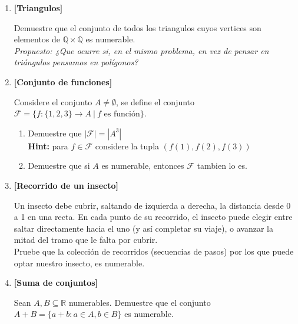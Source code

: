 \documentclass[letterpaper,11pt]{article}
\newcommand{\Q}{\mathbb Q}
\newcommand{\R}{\mathbb R}
\theoremstyle{plain}
\begin{document}
\begin{enumerate}[\bf P1.]
\begin{enumerate}
            
        \end{enumerate}
    
    \item \textbf{[Triangulos]}
    
    Demuestre que el conjunto de todos los triangulos cuyos vertices son elementos de $\Q\times \Q$ es numerable.\\
    \textit{Propuesto: ¿Que ocurre si, en el mismo problema, en vez de pensar en triángulos pensamos en polígonos?}
    
    \item \textbf{[Conjunto de funciones]}
    
    Considere el conjunto $A\neq \emptyset$, se define el conjunto $\mathcal{F}=\{f:\{1,2,3\} \to A ~|~ f \text{ es función} \}$.
        \begin{enumerate}
            \item Demuestre que $|\mathcal{F}|=|A^{3}|$\\
            \textbf{Hint:} para $f\in \mathcal{F}$ considere la tupla $(f(1),f(2),f(3))$
            \item Demuestre que si $A$ es numerable, entonces $\mathcal{F}$ tambien lo es.
        \end{enumerate}
        
    \item \textbf{[Recorrido de un insecto]}
    
    Un insecto debe cubrir, saltando de izquierda a derecha, la distancia desde 0 a 1 en una recta. En cada punto de su recorrido, el insecto puede elegir entre saltar directamente hacia el uno (y así completar su viaje), o avanzar la mitad del tramo que le falta por cubrir.\\
    Pruebe que la colección de recorridos (secuencias de pasos) por los que puede optar nuestro insecto, es numerable.
    
    \item \textbf{[Suma de conjuntos]}
    
    Sean $A,B \subseteq \R$ numerables. Demuestre que el conjunto $A+B=\{a+b : a \in A, b \in B \}$ es numerable.
        
\end{enumerate}
\end{document}
